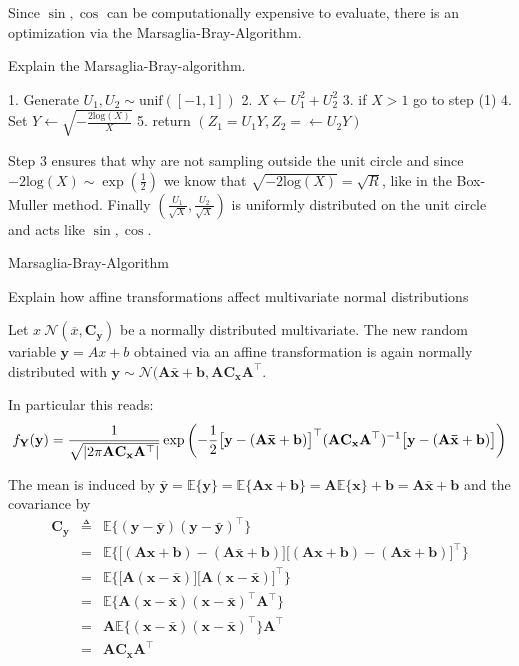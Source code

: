 Since \( \sin, \cos \) can be computationally expensive to evaluate, there is an optimization via 
the Marsaglia-Bray-Algorithm.

Explain the Marsaglia-Bray-algorithm.

1. Generate \( U_1, U_2 \sim \text{unif}([-1, 1]) \)
2. \( X \leftarrow U_1^2 + U_2^2 \)
3. if \( X > 1 \) go to step (1)
4. Set \( Y \leftarrow \sqrt{-\frac{2\text{log}(X)}{X}} \)
5. return \( (Z_1 = U_1 Y, Z_2 = \leftarrow U_2 Y) \)

Step 3 ensures that why are not sampling outside the unit circle
and since \( -2\text{log}(X) \sim \exp(\frac{1}{2}) \) we know that \( \sqrt{-2\text{log}(X)} = \sqrt{R} \),
like in the Box-Muller method.
Finally \( (\frac{U_1}{\sqrt{X}}, \frac{U_2}{\sqrt{X}}) \) is uniformly distributed on the unit circle
and acts like \( \sin, \cos \).



Marsaglia-Bray-Algorithm 

Explain how affine transformations affect multivariate normal distributions

Let \( x ~ \mathcal{N}(\overline{x}, \mathbf{C_y}) \) be a normally distributed multivariate.
The new random variable \( \mathbf{y} = Ax + b \) obtained via an affine transformation is again normally distributed
with \( \mathbf{y} \sim \mathcal{N}(\mathbf{A}\mathbf{\bar{x}+\mathbf{b}, \mathbf{A}\mathbf{C_x}\mathbf{A}^\top} \).

In particular this reads:
\[
f_\mathbf{Y}(\mathbf{y)}
= {1 \over \sqrt{\lvert2\pi\mathbf{A}\mathbf{C_x}\mathbf{A}^\top\rvert}}
\exp\left(- {1 \over 2} \big[\mathbf{y}-(\mathbf{A}\mathbf{\bar{x}}+\mathbf{b}) \big]^\top (\mathbf{A}\mathbf{C_x}\mathbf{A}^\top)^{-1} \big[\mathbf{y}-(\mathbf{A}\mathbf{\bar{x}}+\mathbf{b}) \big] \right)
\]

The mean is induced by
\(
\mathbf{\bar{y}} = \mathbb{E}\{\mathbf{y}\} = \mathbb{E}\{\mathbf{A}\mathbf{x}+\mathbf{b}\} = \mathbf{A}\mathbb{E}\{\mathbf{x}\}+\mathbf{b} = \mathbf{A}\mathbf{\bar{x}}+\mathbf{b}
\)
and the covariance by
\[
\begin{array}{rcl}
\mathbf{C_y} & \triangleq & \mathbb{E}\{(\mathbf{y}-\mathbf{\bar{y}})(\mathbf{y}-\mathbf{\bar{y}})^\top\} \\
& = & \mathbb{E} \Big\{ \Big[ (\mathbf{A}\mathbf{x}+\mathbf{b})-(\mathbf{A}\mathbf{\bar{x}}+\mathbf{b}) \Big] \Big[ (\mathbf{A}\mathbf{x}+\mathbf{b})-(\mathbf{A}\mathbf{\bar{x}}+\mathbf{b}) \Big] ^\top \Big\} \\
& = & \mathbb{E} \Big\{ \Big[ \mathbf{A}(\mathbf{x}-\mathbf{\bar{x}}) \Big] \Big[ \mathbf{A}(\mathbf{x}-\mathbf{\bar{x}}) \Big] ^\top \Big\} \\
& = & \mathbb{E} \Big\{ \mathbf{A}(\mathbf{x}-\mathbf{\bar{x}}) (\mathbf{x}-\mathbf{\bar{x}})^\top \mathbf{A}^\top \Big\} \\
& = & \mathbf{A} \mathbb{E} \Big\{ (\mathbf{x}-\mathbf{\bar{x}}) (\mathbf{x}-\mathbf{\bar{x}})^\top \Big\} \mathbf{A}^\top \\
& = & \mathbf{A}\mathbf{C_x}\mathbf{A}^\top
\end{array}
\]


